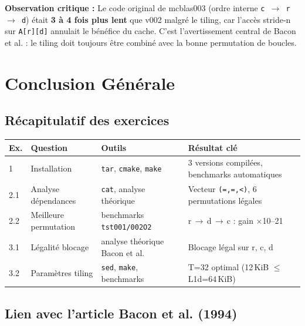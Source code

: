 \documentclass[a4paper,11pt]{article}
\newcommand{\code}[1]{\texttt{\color{CodeRed}#1}}
\newcommand{\cmd}[1]{\texttt{\color{BlueMid}#1}}
\begin{document}
\begin{warningbox}
  \textbf{Observation critique :} Le code original de mcblas003 (ordre interne
  \code{c\,$\to$\,r\,$\to$\,d}) \'etait \textbf{3 \`a 4 fois plus lent} que v002 malgr\'e
  le tiling, car l'acc\`es stride-n sur \code{A[r][d]} annulait le b\'en\'efice du cache.
  C'est l'avertissement central de Bacon et al. : le tiling doit toujours \^etre combin\'e
  avec la bonne permutation de boucles.
\end{warningbox}

\newpage

\section{Conclusion G\'en\'erale}

\subsection{R\'ecapitulatif des exercices}

\begin{center}
\begin{tabular}{C{0.7cm}L{3cm}L{3.5cm}L{6cm}}
  \toprule
  \textbf{Ex.} & \textbf{Question} & \textbf{Outils} & \textbf{R\'esultat cl\'e} \\
     & Installation       & \cmd{tar}, \cmd{cmake}, \cmd{make}     & 3 versions compil\'ees, benchmarks automatiques \\
  2.1 & Analyse d\'ependances & \cmd{cat}, analyse th\'eorique       & Vecteur \texttt{(=,=,<)}, 6 permutations l\'egales \\
  2.2 & Meilleure permutation & benchmarks \cmd{tst001/002O2}        & r\,$\to$\,d\,$\to$\,c : gain $\times$10--21 \\
  3.1 & L\'egalit\'e blocage   & analyse th\'eorique Bacon et al.    & Blocage l\'egal sur r, c, d \\
  3.2 & Param\`etres tiling    & \cmd{sed}, \cmd{make}, benchmarks   & T=32 optimal (12\,KiB $\leq$ L1d=64\,KiB) \\
  \bottomrule
\end{tabular}
\end{center}

\subsection{Lien avec l'article Bacon et al. (1994)}
\end{document}
